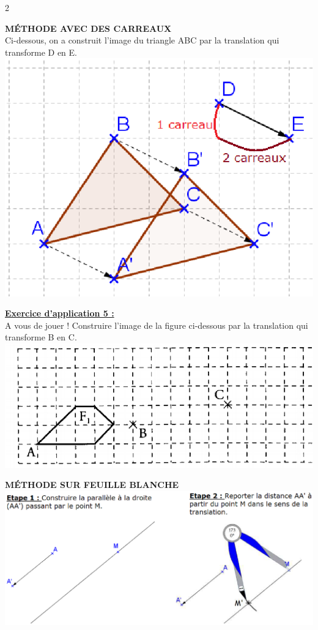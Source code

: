\documentclass[a4paper,11pt]{article}
\newcommand{\textding}[1]{\text{\ding{#1}}}
\newcommand{\bmul}[1]{\begin{multicols}{#1}}
\newcommand{\emul}{\end{multicols}}
\begin{document}
\bmul{2}

 \textding{48} \textbf{MÉTHODE AVEC DES CARREAUX}\\
 
   Ci-dessous, on a construit l'image du triangle ABC par la translation qui transforme D en E.\\
\includegraphics[scale=1.1]{translation3.eps} \\



\columnbreak

\textbf{\underline{Exercice d'application 5 :}}\\
A vous de jouer ! Construire l'image de la figure ci-dessous par la translation qui transforme B en C.\\

\includegraphics[scale=0.85]{translation1.eps} \\

\emul

\newpage


 \textding{48} \textbf{MÉTHODE SUR FEUILLE BLANCHE}\\
\includegraphics[scale=0.9]{translation4.eps} \\
\end{document}

